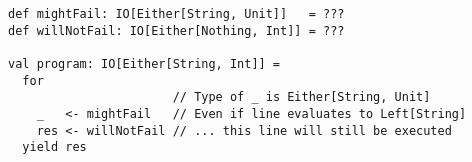 \begin{algorithm}

\begin{verbatim}
def mightFail: IO[Either[String, Unit]]   = ???
def willNotFail: IO[Either[Nothing, Int]] = ???

val program: IO[Either[String, Int]] =
  for
                       // Type of _ is Either[String, Unit]
    _   <- mightFail   // Even if line evaluates to Left[String]
    res <- willNotFail // ... this line will still be executed
  yield res
\end{verbatim}

\caption{Subtle bugs not causing early termination or compilation error %
\label{monadtransformer:subtle-bugs}}
\end{algorithm}